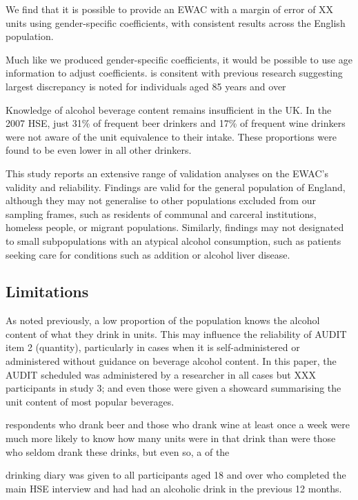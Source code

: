 \documentclass[]{article}
\begin{document}
We find that it is possible to provide an EWAC with a margin of error of
XX units using gender-specific coefficients, with consistent results
across the English population.

Much like we produced gender-specific coefficients, it would be possible
to use age information to adjust coefficients. is consitent with
previous research suggesting largest discrepancy is noted for
individuals aged 85 years and over

Knowledge of alcohol beverage content remains insufficient in the UK. In
the 2007 HSE, just 31\% of frequent beer drinkers and 17\% of frequent
wine drinkers were not aware of the unit equivalence to their intake.
These proportions were found to be even lower in all other drinkers.

This study reports an extensive range of validation analyses on the
EWAC's validity and reliability. Findings are valid for the general
population of England, although they may not generalise to other
populations excluded from our sampling frames, such as residents of
communal and carceral institutions, homeless people, or migrant
populations. Similarly, findings may not designated to small
subpopulations with an atypical alcohol consumption, such as patients
seeking care for conditions such as addition or alcohol liver disease.

\hypertarget{limitations}{%
\subsection{Limitations}\label{limitations}}

As noted previously, a low proportion of the population knows the
alcohol content of what they drink in units. This may influence the
reliability of AUDIT item 2 (quantity), particularly in cases when it is
self-administered or administered without guidance on beverage alcohol
content. In this paper, the AUDIT scheduled was administered by a
researcher in all cases but XXX participants in study 3; and even those
were given a showcard summarising the unit content of most popular
beverages.

respondents who drank beer and those who drank wine at least once a week
were much more likely to know how many units were in that drink than
were those who seldom drank these drinks, but even so, a of the

drinking diary was given to all participants aged 18 and over who
completed the main HSE interview and had had an alcoholic drink in the
previous 12 months.
\end{document}
